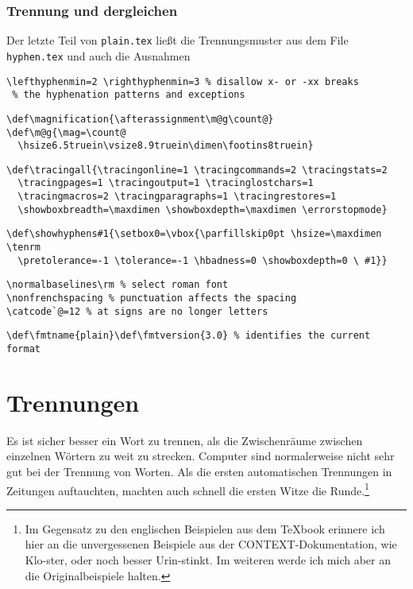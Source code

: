 \begin{appendix}
\subsection{Trennung und dergleichen}
Der letzte Teil von {\tt plain.tex} lie\ss{}t die Trennungsmuster aus dem
File {\tt hyphen.tex} und auch die Ausnahmen
\begin{verbatim}
\lefthyphenmin=2 \righthyphenmin=3 % disallow x- or -xx breaks
 % the hyphenation patterns and exceptions
\end{verbatim}
\begin{verbatim}
\def\magnification{\afterassignment\m@g\count@}
\def\m@g{\mag=\count@
  \hsize6.5truein\vsize8.9truein\dimen\footins8truein}
\end{verbatim}
\begin{verbatim}
\def\tracingall{\tracingonline=1 \tracingcommands=2 \tracingstats=2
  \tracingpages=1 \tracingoutput=1 \tracinglostchars=1
  \tracingmacros=2 \tracingparagraphs=1 \tracingrestores=1 
  \showboxbreadth=\maxdimen \showboxdepth=\maxdimen \errorstopmode}
\end{verbatim}
\begin{verbatim}
\def\showhyphens#1{\setbox0=\vbox{\parfillskip0pt \hsize=\maxdimen \tenrm
  \pretolerance=-1 \tolerance=-1 \hbadness=0 \showboxdepth=0 \ #1}}
\end{verbatim}
\begin{verbatim}
\normalbaselines\rm % select roman font
\nonfrenchspacing % punctuation affects the spacing
\catcode`@=12 % at signs are no longer letters
\end{verbatim}
\begin{verbatim}
\def\fmtname{plain}\def\fmtversion{3.0} % identifies the current format
\end{verbatim}
\chapter{Trennungen}
Es ist sicher besser ein Wort zu trennen, als die 
Zwischenr\"aume
zwischen einzelnen W\"ortern zu weit zu strecken. Computer sind
normalerweise nicht sehr gut bei der Trennung von Worten. Als die
ersten automatischen Trennungen in Zeitungen auftauchten, machten auch
schnell die ersten Witze die Runde.\footnote{Im Gegensatz zu den
englischen Beispielen aus dem \TeX book erinnere ich hier an die
unvergessenen Beispiele aus der CONTEXT-Dokumentation, wie Klo-ster,
oder noch besser Urin-stinkt. Im weiteren werde ich mich aber an die
Originalbeispiele halten.}


\end{appendix}
